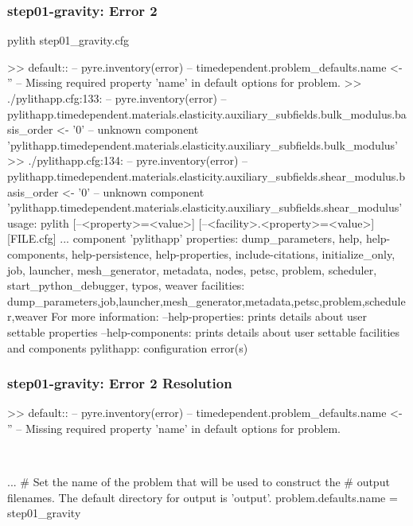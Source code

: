 \documentclass[aspectratio=169]{beamer}
\begin{document}
\begin{frame}[fragile]
  \frametitle{{\ttfamily step01-gravity}: Error 2}

\begin{bashcode}
pylith step01_gravity.cfg

 >> {default}::
 -- pyre.inventory(error)
 -- timedependent.problem_defaults.name <- ''
 -- Missing required property 'name' in default options for problem.
 >> ./pylithapp.cfg:133:
 -- pyre.inventory(error)
 -- pylithapp.timedependent.materials.elasticity.auxiliary_subfields.bulk_modulus.basis_order <- '0'
 -- unknown component 'pylithapp.timedependent.materials.elasticity.auxiliary_subfields.bulk_modulus'
 >> ./pylithapp.cfg:134:
 -- pyre.inventory(error)
 -- pylithapp.timedependent.materials.elasticity.auxiliary_subfields.shear_modulus.basis_order <- '0'
 -- unknown component 'pylithapp.timedependent.materials.elasticity.auxiliary_subfields.shear_modulus'
usage: pylith [--<property>=<value>] [--<facility>.<property>=<value>] [FILE.cfg] ...
component 'pylithapp'
    properties: dump_parameters, help, help-components, help-persistence, help-properties, include-citations, initialize_only, job, launcher, mesh_generator, metadata, nodes, petsc, problem, scheduler, start_python_debugger, typos, weaver
    facilities: dump_parameters,job,launcher,mesh_generator,metadata,petsc,problem,scheduler,weaver
For more information:
  --help-properties: prints details about user settable properties
  --help-components: prints details about user settable facilities and components
pylithapp: configuration error(s)
\end{bashcode}

\end{frame}


\begin{frame}[t,fragile]
  \frametitle{{\ttfamily step01-gravity}: Error 2 Resolution}

  \tserror
  \begin{bashcode}
    >> {default}::
    -- pyre.inventory(error)
    -- timedependent.problem_defaults.name <- ''
    -- Missing required property 'name' in default options for problem.
  \end{bashcode}

  \pause\\[1pt]

  \begin{cfgcode}
    [pylithapp]
    ...
    # Set the name of the problem that will be used to construct the
    # output filenames. The default directory for output is 'output'.
    problem.defaults.name = step01_gravity
  \end{cfgcode}

\end{frame}
\end{document}
